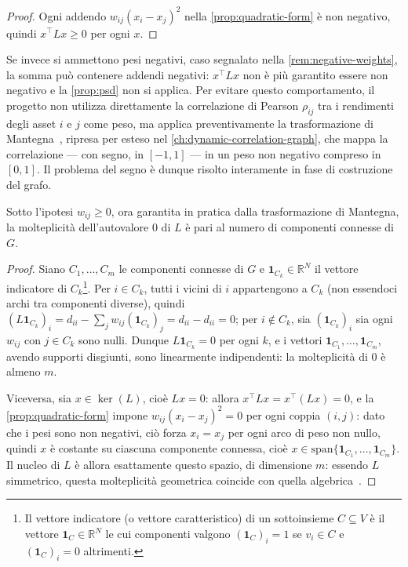 \begin{proof}
Ogni addendo $w_{ij}(x_i-x_j)^2$ nella \cref{prop:quadratic-form} è non negativo, quindi $x^\top Lx \geq 0$ per ogni $x$. \qedhere
\end{proof}

Se invece si ammettono pesi negativi, caso segnalato nella \cref{rem:negative-weights}, la somma può contenere addendi negativi: $x^\top Lx$ non è più garantito essere non negativo e la \cref{prop:psd} non si applica. Per evitare questo comportamento, il progetto non utilizza direttamente la correlazione di Pearson $\rho_{ij}$ tra i rendimenti degli asset $i$ e $j$ come peso, ma applica preventivamente la trasformazione di Mantegna~\cite{mantegna1999hierarchical}, ripresa per esteso nel \cref{ch:dynamic-correlation-graph}, che mappa la correlazione — con segno, in $[-1,1]$ — in un peso non negativo compreso in $[0,1]$. Il problema del segno è dunque risolto interamente in fase di costruzione del grafo.

\begin{proposition}
\label{prop:zero-multiplicity}
Sotto l'ipotesi $w_{ij}\geq 0$, ora garantita in pratica dalla trasformazione di Mantegna, la molteplicità dell'autovalore $0$ di $L$ è pari al numero di componenti connesse di $G$.
\end{proposition}

\begin{proof}
Siano $C_1,\dots,C_m$ le componenti connesse di $G$ e $\mathbf{1}_{C_k}\in\mathbb{R}^N$ il vettore indicatore di $C_k$\footnote{Il vettore indicatore (o vettore caratteristico) di un sottoinsieme $C\subseteq V$ è il vettore $\mathbf{1}_C\in\mathbb{R}^N$ le cui componenti valgono $(\mathbf{1}_C)_i=1$ se $v_i\in C$ e $(\mathbf{1}_C)_i=0$ altrimenti.}. Per $i \in C_k$, tutti i vicini di $i$ appartengono a $C_k$ (non essendoci archi tra componenti diverse), quindi $(L\mathbf{1}_{C_k})_i = d_{ii} - \sum_{j} w_{ij}(\mathbf{1}_{C_k})_j = d_{ii} - d_{ii} = 0$; per $i \notin C_k$, sia $(\mathbf{1}_{C_k})_i$ sia ogni $w_{ij}$ con $j \in C_k$ sono nulli. Dunque $L\mathbf{1}_{C_k}=0$ per ogni $k$, e i vettori $\mathbf{1}_{C_1},\dots,\mathbf{1}_{C_m}$, avendo supporti disgiunti, sono linearmente indipendenti: la molteplicità di $0$ è almeno $m$.

Viceversa, sia $x\in\ker(L)$, cioè $Lx=0$: allora $x^\top Lx = x^\top(Lx) = 0$, e la \cref{prop:quadratic-form} impone $w_{ij}(x_i-x_j)^2=0$ per ogni coppia $(i,j)$: dato che i pesi sono non negativi, ciò forza $x_i=x_j$ per ogni arco di peso non nullo, quindi $x$ è costante su ciascuna componente connessa, cioè $x\in\mathrm{span}\{\mathbf{1}_{C_1},\dots,\mathbf{1}_{C_m}\}$. Il nucleo di $L$ è allora esattamente questo spazio, di dimensione $m$: essendo $L$ simmetrico, questa molteplicità geometrica coincide con quella algebrica~\cite{chung1997spectral}. \qedhere
\end{proof}

